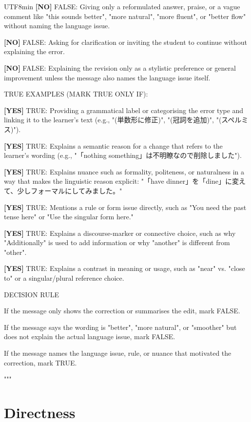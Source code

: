 \begin{CJK}{UTF8}{min}
\textbf{[NO]} FALSE: Giving only a reformulated answer, praise, or a vague comment like "this sounds better", "more natural", "more fluent", or "better flow" without naming the language issue.

\textbf{[NO]} FALSE: Asking for clarification or inviting the student to continue without explaining the error.

\textbf{[NO]} FALSE: Explaining the revision only as a stylistic preference or general improvement unless the message also names the language issue itself.

TRUE EXAMPLES (MARK TRUE ONLY IF):

\textbf{[YES]} TRUE: Providing a grammatical label or categorising the error type and linking it to the learner's text (e.g., "(単数形に修正)", "(冠詞を追加)", "(スペルミス)").

\textbf{[YES]} TRUE: Explains a semantic reason for a change that refers to the learner's wording (e.g., "「nothing something」は不明瞭なので削除しました").

\textbf{[YES]} TRUE: Explains nuance such as formality, politeness, or naturalness in a way that makes the linguistic reason explicit: "「have dinner」を「dine」に変えて、少しフォーマルにしてみました。"

\textbf{[YES]} TRUE: Mentions a rule or form issue directly, such as "You need the past tense here" or "Use the singular form here."

\textbf{[YES]} TRUE: Explains a discourse-marker or connective choice, such as why "Additionally" is used to add information or why "another" is different from "other".

\textbf{[YES]} TRUE: Explains a contrast in meaning or usage, such as "near" vs. "close to" or a singular/plural reference choice.

DECISION RULE

If the message only shows the correction or summarises the edit, mark FALSE.

If the message says the wording is "better", "more natural", or "smoother" but does not explain the actual language issue, mark FALSE.

If the message names the language issue, rule, or nuance that motivated the correction, mark TRUE.

"""

\section{Directness}


\end{CJK}
